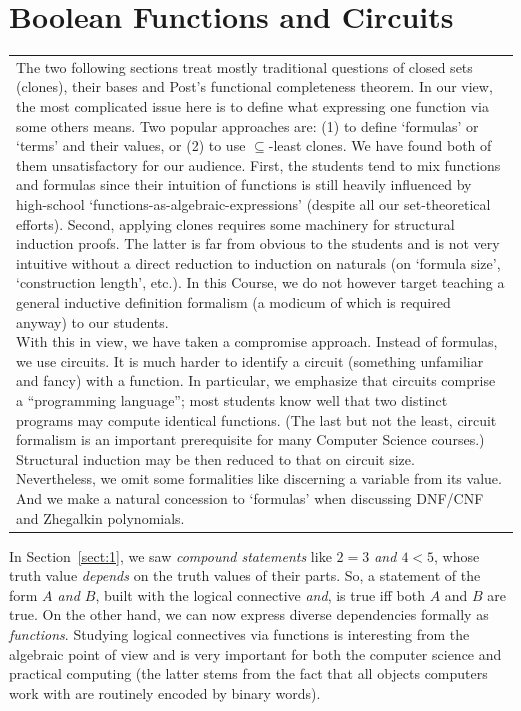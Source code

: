 \documentclass[12pt,notitlepage]{article}
\theoremstyle{plain}
\theoremstyle{definition}
\theoremstyle{plain}
\newcommand{\sbs}{\subseteq}
\newcommand{\1}{\mathbf{1}}
\newcommand{\0}{\mathbf{0}}
\newcommand{\mcomm}[1]{
\medskip\noindent\begin{tabular}{| l}
\parbox{0.99\textwidth}{{\small
#1 }}\end{tabular}
\smallskip}
\begin{document}
\section{Boolean Functions and Circuits}
\mcomm{The two following sections treat mostly traditional questions of closed sets (clones), their bases and Post's functional completeness theorem. In our view, the most complicated issue here is to define what expressing one function via some others means. Two popular approaches are: (1) to define `formulas' or `terms' and their values, or (2) to use ${\sbs}$-least clones. We have found both of them unsatisfactory for our audience. First, the students tend to mix functions and formulas since their intuition of functions is still heavily influenced by high-school `functions-as-algebraic-expressions' (despite all our set-theoretical efforts). Second, applying clones requires some machinery for structural induction proofs. The latter is far from obvious to the students and is not very intuitive without a direct reduction to induction on naturals (on `formula size', `construction length', etc.). In this Course, we do not however target teaching a general inductive definition formalism (a modicum of which is required anyway) to  our students.
\medskip\\
With this in view, we have taken a compromise approach. Instead of formulas, we use circuits. It is much harder to identify a circuit (something unfamiliar and fancy) with a function. In particular, we emphasize that circuits comprise a ``programming language''; most students know well that two distinct programs may compute identical functions. (The last but not the least, circuit formalism is an important prerequisite for many Computer Science courses.) Structural induction may be then reduced to that on circuit size.
\medskip\\
Nevertheless, we omit some formalities like discerning a variable from its value. And we make a natural concession to `formulas' when discussing DNF/CNF and Zhegalkin polynomials.
}

In Section~\ref{sect:1}, we saw \emph{compound statements} like \emph{$2 = 3$ and $4 < 5$}, whose truth value \emph{depends} on the truth values of their parts. So, a statement of the form \emph{$A$ and $B$}, built with the logical connective \emph{and}, is true iff both $A$ and $B$ are true. On the other hand, we can now express diverse dependencies formally as \emph{functions}. Studying logical connectives via functions is interesting from the algebraic point of view and is very important for both the computer science and practical computing (the latter stems from the fact that all objects computers work with are routinely encoded by binary words).
\end{document}
